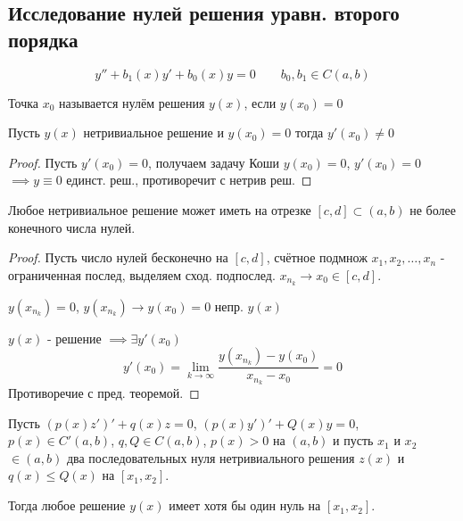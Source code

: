 \documentclass{article}
\begin{document}
\subsection{Исследование нулей решения уравн. второго порядка}
\[
  y''+b_1(x)y'+b_0(x)y=0 \qquad b_0,b_1\in C(a,b)
\]
\begin{definition}
  Точка $x_0$ называется нулём решения $y(x)$, если $y(x_0)=0$
\end{definition}
\begin{theorem}
  Пусть $y(x)$ нетривиальное решение и $y(x_0)=0$ тогда $y'(x_0)\neq 0$
\end{theorem}
\begin{proof}
  Пусть $y'(x_0)=0$, получаем задачу Коши $y(x_0)=0$, $y'(x_0)=0$ $\implies y\equiv 0$
  единст. реш., противоречит с нетрив реш.
\end{proof}
\begin{theorem}
  Любое нетривиальное решение может иметь на отрезке $[c,d]\subset (a,b)$
  не более конечного числа нулей.
\end{theorem}
\begin{proof}
  Пусть число нулей бесконечно на $[c,d]$, счётное подмнож $x_1,x_2,\dots , x_n$ -
  ограниченная послед, выделяем сход. подпослед. $x_{n_{k}}\to x_0\in [c,d]$.

  $y(x_{n_{k}})=0$, $y(x_{n_{k}})\to y(x_0)=0$ непр. $y(x)$

  $y(x)$ - решение $\implies \exists y'(x_0)$
  \[
    y'(x_0)=\lim\limits_{k\to\infty}\frac{y(x_{n_{k}})-y(x_0)}{x_{n_{k}}-x_0}=0
  \]
  Противоречие с пред. теоремой.
\end{proof}

\begin{theorem}
  Пусть $(p(x)z')'+q(x)z=0$, $(p(x)y')'+Q(x)y=0$, $p(x)\in C'(a,b)$, $q,Q\in C(a,b)$,
  $p(x)>0$ на $(a,b)$ и пусть $x_1$ и $x_2$ $\in (a,b)$ 
  два последовательных нуля нетривиального решения $z(x)$
  и $q(x)\le Q(x)$ на $[x_1,x_2]$.

  Тогда любое решение $y(x)$ имеет хотя бы один нуль на $[x_1,x_2]$.

\end{theorem}
\end{document}
